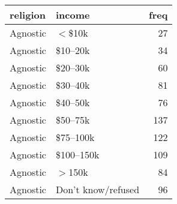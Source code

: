 \begin{tabular}{llr}
  \toprule
 religion & income & freq \\ 
  \midrule
  Agnostic & $<$\$10k &  27 \\ 
  Agnostic & \$10--20k &  34 \\ 
  Agnostic & \$20--30k &  60 \\ 
  Agnostic & \$30--40k &  81 \\ 
  Agnostic & \$40--50k &  76 \\ 
  Agnostic & \$50--75k & 137 \\ 
  Agnostic & \$75--100k & 122 \\ 
  Agnostic & \$100--150k & 109 \\ 
  Agnostic & $>$150k &  84 \\ 
  Agnostic & Don't know/refused &  96 \\ 
   \bottomrule
\end{tabular}
